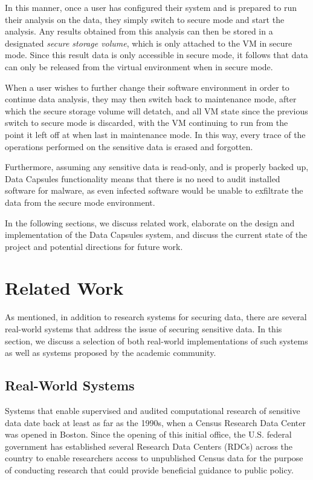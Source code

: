 \documentclass{acm_proc_article-sp}
\begin{document}
In this manner, once a user has configured their system and is prepared to
run their analysis on the data, they simply switch to secure mode and start
the analysis.  Any results obtained from this analysis can then be stored in a
designated \emph{secure storage volume}, which is only attached to the VM in
secure mode.  Since this result data is only accessible in secure mode, it
follows that data can only be released from the virtual environment when in
secure mode.

When a user wishes to further change their software environment in order to
continue data analysis, they may then switch back to maintenance mode, after
which the secure storage volume will detatch, and all VM state since the
previous switch to secure mode is discarded, with the VM continuing to run from
the point it left off at when last in maintenance mode.  In this way, every
trace of the operations performed on the sensitive data is erased and forgotten.

Furthermore, assuming any sensitive data is read-only, and is properly backed
up, Data Capsules functionality means that there is no need to audit installed
software for malware, as even infected software would be unable to exfiltrate
the data from the secure mode environment.

In the following sections, we discuss related work, elaborate on the design and
implementation of the Data Capsules system, and discuss the current state of
the project and potential directions for future work.

\section{Related Work}

As mentioned, in addition to research systems for securing data, there are
several real-world systems that address the issue of securing sensitive data.
In this section, we discuss a selection of both real-world implementations of
such systems as well as systems proposed by the academic community.

\subsection{Real-World Systems}

Systems that enable supervised and audited computational research of sensitive
data date back at least as far as the 1990s, when a Census Research Data Center
was opened in Boston.  Since the opening of this initial office, the U.S.
federal government has established several Research Data Centers (RDCs)
\cite{census-rdc} across the country to enable researchers access to
unpublished Census data for the purpose of conducting research that could
provide beneficial guidance to public policy.
\end{document}
